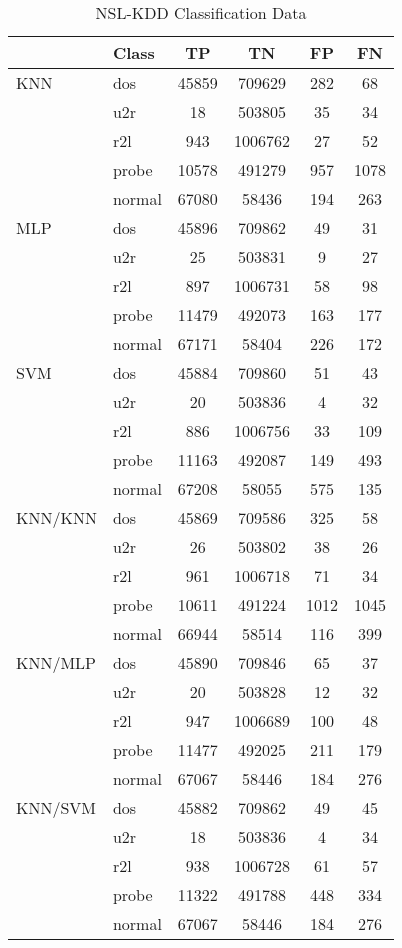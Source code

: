 \begin{longtable}{@{}llcccc@{}}
\caption{NSL-KDD Classification Data} \\
\toprule
 & Class & TP & TN & FP & FN \\ \midrule
KNN & dos & 45859 & 709629 & 282 & 68 \\
 & u2r & 18 & 503805 & 35 & 34 \\
 & r2l & 943 & 1006762 & 27 & 52 \\
 & probe & 10578 & 491279 & 957 & 1078 \\
 & normal & 67080 & 58436 & 194 & 263 \\
MLP & dos & 45896 & 709862 & 49 & 31 \\
 & u2r & 25 & 503831 & 9 & 27 \\
 & r2l & 897 & 1006731 & 58 & 98 \\
 & probe & 11479 & 492073 & 163 & 177 \\
 & normal & 67171 & 58404 & 226 & 172 \\
SVM & dos & 45884 & 709860 & 51 & 43 \\
 & u2r & 20 & 503836 & 4 & 32 \\
 & r2l & 886 & 1006756 & 33 & 109 \\
 & probe & 11163 & 492087 & 149 & 493 \\
 & normal & 67208 & 58055 & 575 & 135 \\
KNN/KNN & dos & 45869 & 709586 & 325 & 58 \\
 & u2r & 26 & 503802 & 38 & 26 \\
 & r2l & 961 & 1006718 & 71 & 34 \\
 & probe & 10611 & 491224 & 1012 & 1045 \\
 & normal & 66944 & 58514 & 116 & 399 \\
KNN/MLP & dos & 45890 & 709846 & 65 & 37 \\
 & u2r & 20 & 503828 & 12 & 32 \\
 & r2l & 947 & 1006689 & 100 & 48 \\
 & probe & 11477 & 492025 & 211 & 179 \\
 & normal & 67067 & 58446 & 184 & 276 \\
KNN/SVM & dos & 45882 & 709862 & 49 & 45 \\
 & u2r & 18 & 503836 & 4 & 34 \\
 & r2l & 938 & 1006728 & 61 & 57 \\
 & probe & 11322 & 491788 & 448 & 334 \\
 & normal & 67067 & 58446 & 184 & 276 \\

\end{longtable}
